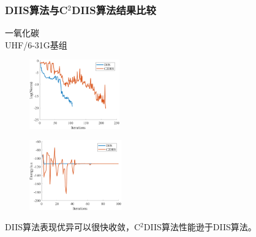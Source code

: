 \documentclass[10pt,aspectratio=43,mathserif,UTF8]{beamer}
\begin{document}
\begin{frame}
	\frametitle{DIIS算法与C$^2$DIIS算法结果比较}
	一氧化碳\\
	UHF/6-31G基组
	\begin{figure}[ht!]
		\centering
		\begin{minipage}{0.4\linewidth}
			\centering
			\includegraphics[height=3cm]{figure/co/LOG2.png}
			\label{fig:co:lognorm}
		\end{minipage}
		\begin{minipage}{0.4\linewidth}
			\centering
			\includegraphics[height=3cm]{figure/co/E3.png}
			\label{fig:co:E}
		\end{minipage}
		\label{fig:co}
	\end{figure}
	\centerline{DIIS算法表现优异可以很快收敛，C$^2$DIIS算法性能逊于DIIS算法。}
\end{frame}


\end{document}
